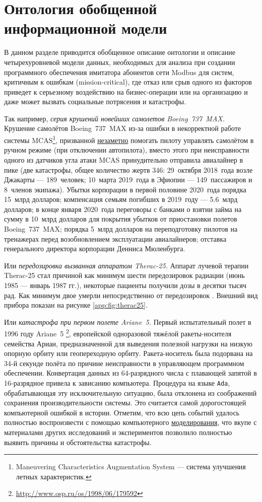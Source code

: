 \chapter{Онтология обобщенной информационной модели}
В данном разделе приводится обобщенное описание онтологии и описание четырехуровневой модели данных,
необходимых для анализа при создании программного обеспечения имитатора абонентов сети Modbus
для систем, критичным к ошибкам (mission-critical),
где отказ или срыв одного из факторов приведет к серьезному воздействию на бизнес-операции или на организацию
и даже может вызвать социальные потрясения и катастрофы.

Так например, \textit{серия крушений новейших самолетов Boeing~737~MAX.}
Крушение самолётов Boeing~737~MAX из-за ошибки в некорректной работе системы
MCAS\footnote{Maneuvering Characteristics Augmentation System --- система улучшения летных характеристик.},
призванной \underline{незаметно} помогать пилоту управлять самолётом в ручном режиме (при отключении автопилота),
вместо этого при неисправности одного из датчиков угла атаки MCAS принудительно отправила авиалайнер в пике
(две катастрофы, общее количество жертв 346:
    29~октября 2018~года возле Джакарты --- 189~человек;
    10~марта 2019~года в Эфиопии --- 149~пассажиров и 8~членов экипажа).
Убытки корпорации в первой половине 2020~года порядка 15~млрд долларов;
компенсация семьям погибших в 2019~году --- 5.6~млрд долларов;
в конце января 2020~года переговоры с банками о взятии займа на сумму в 10~млрд долларов для покрытия убытков от приостановки полетов Boeing~737~MAX;
порядка 5~млрд долларов на переподготовку пилотов на тренажерах перед возобновлением эксплуатации авиалайнеров;
отставка генерального директора корпорации Денниса Мюленбурга.

Или \textit{передозировка вызванная аппаратом Therac-25.}
Аппарат лучевой терапии Therac-25 стал причиной как минимум шести передозировок радиации (июнь 1985 --- январь 1987 гг.),
некоторые пациенты получили дозы в десятки тысяч рад. Как минимум двое умерли непосредственно от передозировок \cite{journal:computer:1993:therac25}.
Внешний вид прибора показан на рисунке \ref{app:fig:therac25}.

Или \textit{катастрофа при первом полете Ariane~5.}
Первый испытательный полет в 1996 году Ariane~5
\cite{journal:open_system:1998_adjaev}\footnote{\url{http://www.osp.ru/os/1998/06/179592}},
европейской одноразовой тяжёлой ракеты-носителя семейства Ариан,
предназначенной для выведения полезной нагрузки на низкую опорную орбиту или геопереходную орбиту. 
Ракета-носитель была подорвана на 34-й секунде полёта по причине неисправности в управляющем программном обеспечении.
Конвертация данных из 64-разрядного числа с плавающей запятой в 16-разрядное привела к зависанию компьютера.
Процедура на языке \texttt{Ada}, обрабатывающая эту исключительную ситуацию, была отклонена из соображений сохранения производительности системы.
Это считается самой дорогостоящей компьютерной ошибкой в истории.
Отметим, что всю цепь событий удалось полностью воспроизвести с помощью компьютерного \underline{моделирования},
что вкупе с материалами других исследований и экспериментов позволило полностью выявить причины и обстоятельства катастрофы.

